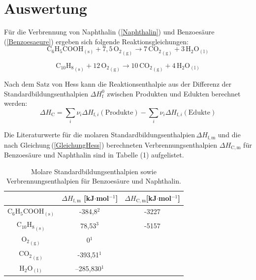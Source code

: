 \documentclass[12pt,a4paper,titlepage,headinclude,bibtotoc]{scrartcl}
\begin{document}
\section{Auswertung}
Für die Verbrennung von Naphthalin (\ref{Naphthalin}) und Benzoesäure (\ref{Benzoesaeure}) ergeben sich folgende Reaktionsgleichungen:\\

\begin{equation}\label{Benzoesaeure}
\mathrm{C_6}\mathrm{H}_5\mathrm{COOH}_\mathrm{(s)} + 7,5\,{\mathrm{O}_2}_\mathrm{(g)} \rightarrow 7\,{\mathrm{CO}_2}_\mathrm{(g)} +3\,\mathrm{H}_2\mathrm{O}_\mathrm{(l)}
\end{equation}

\begin{equation}\label{Naphthalin}
{\mathrm{C}_{10}\mathrm{H}_8}_\mathrm{(s)} + 12\,{\mathrm{O}_2}_\mathrm{(g)} \rightarrow 10\,{\mathrm{CO}_2}_\mathrm{(g)} + 4\,\mathrm{H}_2\mathrm{O}_\mathrm{(l)}
\end{equation}

Nach dem Satz von Hess kann die Reaktionsenthalpie aus der Differenz der Standardbildungsenthalpien $\Delta H_\mathrm{f}^0$ zwischen Produkten und Edukten berechnet werden:\\

\begin{equation} \label{GleichungHess}
\Delta H_\mathrm{C} = \sum_i \nu_i\Delta H_{\mathrm{f},i}\mathrm{(Produkte)} - \sum_i \nu_i\Delta H_{\mathrm{f},i}\mathrm{(Edukte)}
\end{equation}

Die Literaturwerte für die molaren Standardbildungsenthalpien\,$\Delta H_{\mathrm{f,m}}$ und die nach Gleichung\,(\ref{GleichungHess}) berechneten Verbrennungsenthalpien $\Delta H_\mathrm{C,m}$ für Benzoesäure und Naphthalin sind in  Tabelle
(1)
aufgelistet.\\

\begin{center}
\begin{table} [ht!] \label{tab:LiteraturwerteBildungsenthalpien}
\caption{Molare Standardbildungsenthalpien sowie Verbrennungsenthalpien für Benzoesäure und Naphthalin.}
\centering
\begin{tabular}{c|c|c} 
  & $\Delta H_{\mathrm{f,m}}$ [kJ$\cdot$mol$^{-1}$] &$\Delta H_\mathrm{C,m}$[kJ$\cdot$mol$^{-1}$]\\ 
 \hline 
 $\mathrm{C}_6\mathrm{H}_5\mathrm{COOH}_\mathrm{(s)}$ & -384,8$^2$&-3227 \\ 
 \hline 
 ${\mathrm{C}_{10}\mathrm{H}_8}_\mathrm{(s)}$ & 78,53$^3$ &-5157\\
 \hline 
 ${\mathrm{O}_2}_\mathrm{(g)}$ & 0$^1$ \\ 
 \hline 
 ${\mathrm{CO}_2}_\mathrm{(g)}$ & -393,51$^1$ \\ 
 \hline 
 $\mathrm{H}_2\mathrm{O}_\mathrm{(l)}$ & –285,830$^1$ \\ 
 \end{tabular}  
\end{table}
\end{center}
\FloatBarrier
\end{document}

